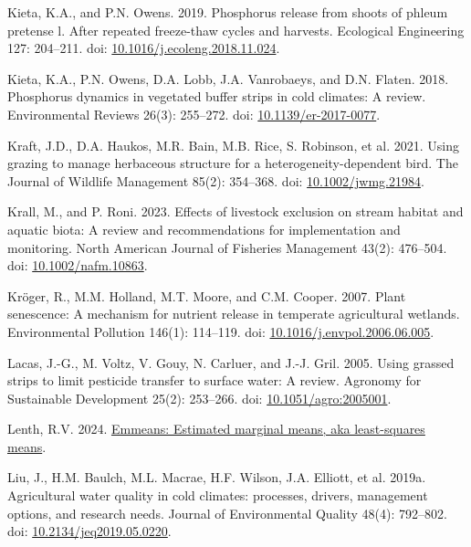 \documentclass[
]{agujournal2019}
\newlength{\cslhangindent}
\newenvironment{CSLReferences}[2] %
 {\begin{list}{}{%
  \setlength{\itemindent}{0pt}
  \setlength{\leftmargin}{0pt}
  \setlength{\parsep}{0pt}
  \ifodd #1
   \setlength{\leftmargin}{\cslhangindent}
   \setlength{\itemindent}{-1\cslhangindent}
  \fi
  \setlength{\itemsep}{#2\baselineskip}}}
 {\end{list}}
\begin{document}
\begin{CSLReferences}{1}{1}
Kieta, K.A., and P.N. Owens. 2019. Phosphorus release from shoots of
phleum pretense l. After repeated freeze-thaw cycles and harvests.
Ecological Engineering 127: 204--211. doi:
\href{https://doi.org/10.1016/j.ecoleng.2018.11.024}{10.1016/j.ecoleng.2018.11.024}.

Kieta, K.A., P.N. Owens, D.A. Lobb, J.A. Vanrobaeys, and D.N. Flaten.
2018. Phosphorus dynamics in vegetated buffer strips in cold climates: A
review. Environmental Reviews 26(3): 255--272. doi:
\href{https://doi.org/10.1139/er-2017-0077}{10.1139/er-2017-0077}.

Kraft, J.D., D.A. Haukos, M.R. Bain, M.B. Rice, S. Robinson, et al.
2021. Using grazing to manage herbaceous structure for a
heterogeneity-dependent bird. The Journal of Wildlife Management 85(2):
354--368. doi:
\href{https://doi.org/10.1002/jwmg.21984}{10.1002/jwmg.21984}.

Krall, M., and P. Roni. 2023. Effects of livestock exclusion on stream
habitat and aquatic biota: A review and recommendations for
implementation and monitoring. North American Journal of Fisheries
Management 43(2): 476--504. doi:
\href{https://doi.org/10.1002/nafm.10863}{10.1002/nafm.10863}.

Kröger, R., M.M. Holland, M.T. Moore, and C.M. Cooper. 2007. Plant
senescence: A mechanism for nutrient release in temperate agricultural
wetlands. Environmental Pollution 146(1): 114--119. doi:
\href{https://doi.org/10.1016/j.envpol.2006.06.005}{10.1016/j.envpol.2006.06.005}.

Lacas, J.-G., M. Voltz, V. Gouy, N. Carluer, and J.-J. Gril. 2005. Using
grassed strips to limit pesticide transfer to surface water: A review.
Agronomy for Sustainable Development 25(2): 253--266. doi:
\href{https://doi.org/10.1051/agro:2005001}{10.1051/agro:2005001}.

Lenth, R.V. 2024.
\href{https://CRAN.R-project.org/package=emmeans}{Emmeans: Estimated
marginal means, aka least-squares means}.

Liu, J., H.M. Baulch, M.L. Macrae, H.F. Wilson, J.A. Elliott, et al.
2019a. Agricultural water quality in cold climates: processes, drivers,
management options, and research needs. Journal of Environmental Quality
48(4): 792--802. doi:
\href{https://doi.org/10.2134/jeq2019.05.0220}{10.2134/jeq2019.05.0220}.


\end{CSLReferences}
\end{document}

